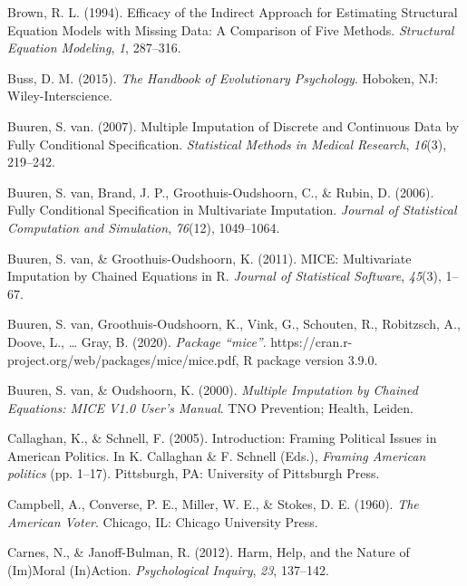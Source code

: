 \documentclass[12pt,econ]{sources/authesis}
\begin{document}
\leavevmode\hypertarget{ref-brown_1994_efficacy}{}%
Brown, R. L. (1994). Efficacy of the Indirect Approach for Estimating Structural Equation Models with Missing Data: A Comparison of Five Methods. \emph{Structural Equation Modeling}, \emph{1}, 287--316.

\leavevmode\hypertarget{ref-buss_2015_handbook}{}%
Buss, D. M. (2015). \emph{The Handbook of Evolutionary Psychology}. Hoboken, NJ: Wiley-Interscience.

\leavevmode\hypertarget{ref-buuren_2007_multiple}{}%
Buuren, S. van. (2007). Multiple Imputation of Discrete and Continuous Data by Fully Conditional Specification. \emph{Statistical Methods in Medical Research}, \emph{16}(3), 219--242.

\leavevmode\hypertarget{ref-buuren_2006_fully}{}%
Buuren, S. van, Brand, J. P., Groothuis-Oudshoorn, C., \& Rubin, D. (2006). Fully Conditional Specification in Multivariate Imputation. \emph{Journal of Statistical Computation and Simulation}, \emph{76}(12), 1049--1064.

\leavevmode\hypertarget{ref-buuren_2011_mice}{}%
Buuren, S. van, \& Groothuis-Oudshoorn, K. (2011). MICE: Multivariate Imputation by Chained Equations in R. \emph{Journal of Statistical Software}, \emph{45}(3), 1--67.

\leavevmode\hypertarget{ref-buuren_2020_package}{}%
Buuren, S. van, Groothuis-Oudshoorn, K., Vink, G., Schouten, R., Robitzsch, A., Doove, L., \ldots{} Gray, B. (2020). \emph{Package ``mice''}. https://cran.r-project.org/web/packages/mice/mice.pdf, R package version 3.9.0.

\leavevmode\hypertarget{ref-buuren_2000_multiple}{}%
Buuren, S. van, \& Oudshoorn, K. (2000). \emph{Multiple Imputation by Chained Equations: MICE V1.0 User's Manual}. TNO Prevention; Health, Leiden.

\leavevmode\hypertarget{ref-callaghan_introduction_2005}{}%
Callaghan, K., \& Schnell, F. (2005). Introduction: Framing Political Issues in American Politics. In K. Callaghan \& F. Schnell (Eds.), \emph{Framing American politics} (pp. 1--17). Pittsburgh, PA: University of Pittsburgh Press.

\leavevmode\hypertarget{ref-campbell_american_1960}{}%
Campbell, A., Converse, P. E., Miller, W. E., \& Stokes, D. E. (1960). \emph{The American Voter}. Chicago, IL: Chicago University Press.

\leavevmode\hypertarget{ref-carnes_2012_harm}{}%
Carnes, N., \& Janoff-Bulman, R. (2012). Harm, Help, and the Nature of (Im)Moral (In)Action. \emph{Psychological Inquiry}, \emph{23}, 137--142.
\end{document}
